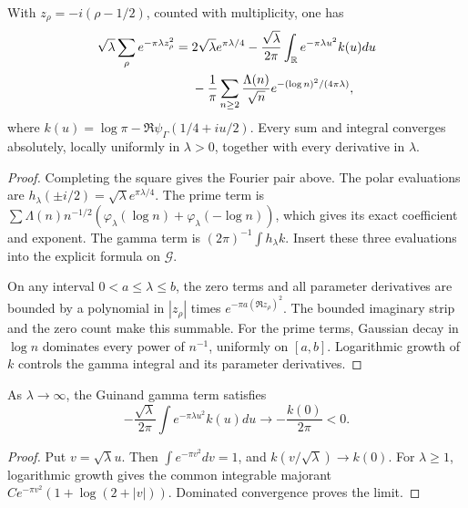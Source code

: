 \begin{theorem}
\label{v4-arith:w5-i:thm:weil-gauss-closed}
With $z_\rho=-i(\rho-1/2)$, counted with multiplicity, one has
\begin{align}
 \sqrt\lambda\sum_\rho e^{-\pi\lambda z_\rho^2}
 ={}&2\sqrt\lambda e^{\pi\lambda/4}
 -\frac{\sqrt\lambda}{2\pi}\int_{\mathbb R}
 e^{-\pi\lambda u^2}k(u)du\notag\\
 &-\frac1\pi\sum_{n\ge2}\frac{\Lambda(n)}{\sqrt n}
              e^{-(\log n)^2/(4\pi\lambda)},
 \label{v4-arith:w5-i:eq:weil-id-gauss}
\end{align}
where $k(u)=\log\pi-\Re\psi_\Gamma(1/4+iu/2)$.
Every sum and integral converges absolutely, locally uniformly in
$\lambda>0$, together with every derivative in $\lambda$.
\end{theorem}
\begin{proof}
Completing the square gives the Fourier pair above.
The polar evaluations are $h_\lambda(\pm i/2)
=\sqrt\lambda e^{\pi\lambda/4}$.
The prime term is $\sum\Lambda(n)n^{-1/2}
(\varphi_\lambda(\log n)+\varphi_\lambda(-\log n))$,
which gives its exact coefficient and exponent.
The gamma term is $(2\pi)^{-1}\int h_\lambda k$.
Insert these three evaluations into the explicit formula on
$\mathscr G$.

On any interval $0<a\le\lambda\le b$, the zero terms and all
parameter derivatives are bounded by a polynomial in $|z_\rho|$
times $e^{-\pi a(\Re z_\rho)^2}$.
The bounded imaginary strip and the zero count make this summable.
For the prime terms, Gaussian decay in $\log n$ dominates every
power of $n^{-1}$, uniformly on $[a,b]$. Logarithmic growth of $k$
controls the gamma integral and its parameter derivatives.
\end{proof}

\begin{proposition}
As $\lambda\to\infty$, the Guinand gamma term satisfies
\[
 -\frac{\sqrt\lambda}{2\pi}\int e^{-\pi\lambda u^2}k(u)du
 \longrightarrow-\frac{k(0)}{2\pi}<0.
\]
\end{proposition}
\begin{proof}
Put $v=\sqrt\lambda u$. Then $\int e^{-\pi v^2}dv=1$,
and $k(v/\sqrt\lambda)\to k(0)$.
For $\lambda\ge1$, logarithmic growth gives the common integrable
majorant $C e^{-\pi v^2}(1+\log(2+|v|))$.
Dominated convergence proves the limit.
\end{proof}

